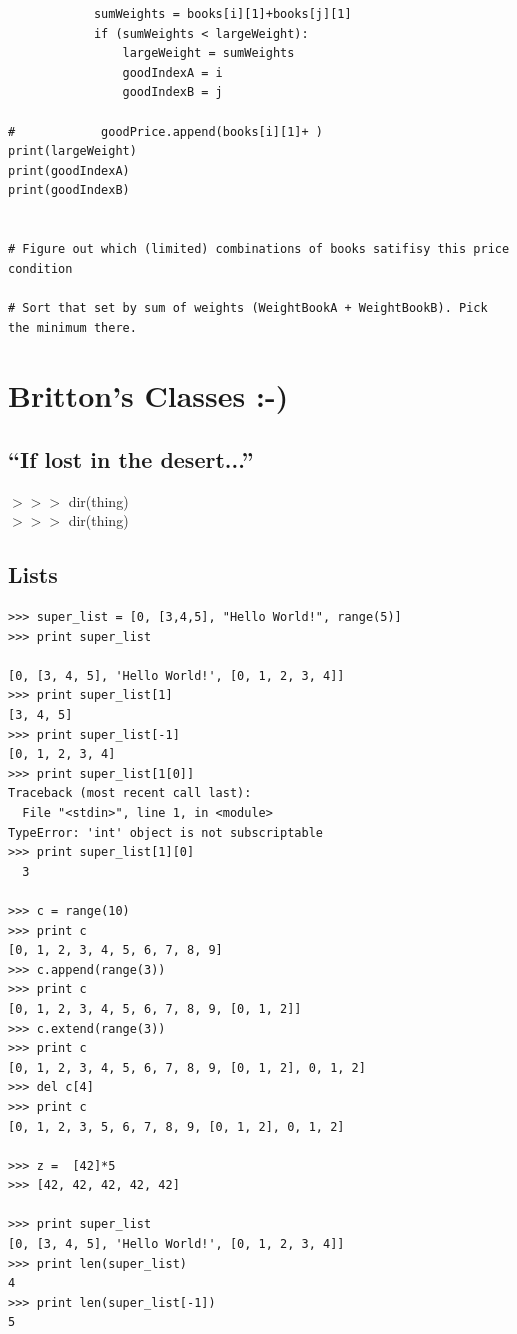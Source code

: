 \documentclass[11pt,a4paper]{article}
\begin{document}
\begin{lstlisting}
            sumWeights = books[i][1]+books[j][1]
            if (sumWeights < largeWeight):
                largeWeight = sumWeights
                goodIndexA = i     
                goodIndexB = j            
        
#            goodPrice.append(books[i][1]+ )
print(largeWeight) 
print(goodIndexA)
print(goodIndexB)


# Figure out which (limited) combinations of books satifisy this price condition

# Sort that set by sum of weights (WeightBookA + WeightBookB). Pick the minimum there. 

\end{lstlisting}


    


\newpage
\section{Britton's Classes :-)}

\subsection{``If lost in the desert...''}
$>>>$ dir(thing) \\
$>>>$ dir(thing) \\




\subsection{Lists}
\begin{lstlisting}
>>> super_list = [0, [3,4,5], "Hello World!", range(5)] 
>>> print super_list 

[0, [3, 4, 5], 'Hello World!', [0, 1, 2, 3, 4]] 
>>> print super_list[1] 
[3, 4, 5] 
>>> print super_list[-1]
[0, 1, 2, 3, 4] 
>>> print super_list[1[0]] 
Traceback (most recent call last):
  File "<stdin>", line 1, in <module>
TypeError: 'int' object is not subscriptable
>>> print super_list[1][0] 
  3

>>> c = range(10) 
>>> print c 
[0, 1, 2, 3, 4, 5, 6, 7, 8, 9]
>>> c.append(range(3)) 
>>> print c 
[0, 1, 2, 3, 4, 5, 6, 7, 8, 9, [0, 1, 2]]
>>> c.extend(range(3)) 
>>> print c 
[0, 1, 2, 3, 4, 5, 6, 7, 8, 9, [0, 1, 2], 0, 1, 2]
>>> del c[4]
>>> print c
[0, 1, 2, 3, 5, 6, 7, 8, 9, [0, 1, 2], 0, 1, 2]

>>> z =  [42]*5
>>> [42, 42, 42, 42, 42]

>>> print super_list
[0, [3, 4, 5], 'Hello World!', [0, 1, 2, 3, 4]]
>>> print len(super_list)
4
>>> print len(super_list[-1])
5
\end{lstlisting}
\end{document}
